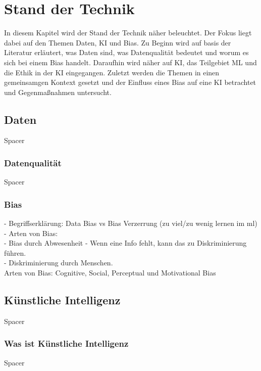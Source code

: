 \chapter{Stand der Technik}
    \begin{onehalfspace}  
        \label{sec:theorie/standdertechnik}
            In diesem Kapitel wird der Stand der Technik näher beleuchtet. Der Fokus liegt dabei auf den Themen Daten, \ac*{KI} und Bias. Zu Beginn wird auf basis der Literatur erläutert, was Daten sind, was Datenqualität bedeutet und worum es sich bei einem Bias handelt. Daraufhin wird näher auf \ac*{KI}, das Teilgebiet \ac*{ML} und die Ethik in der \ac*{KI} eingegangen. Zuletzt werden die Themen in einen gemeinsamgen Kontext gesetzt und der Einfluss eines Bias auf eine \ac*{KI} betrachtet und Gegenmaßnahmen untersucht. 
        
        \section{Daten}
        \label{subsec:daten}
            Spacer

        \subsection{Datenqualität}
        \label{subsubsec:datenqualität}
            Spacer

        \subsection{Bias}
        \label{subsubsec:Bias}
            -   Begriffserklärung: Data Bias vs Bias Verzerrung (zu viel/zu wenig lernen im ml)\\
            -   Arten von Bias: \\
                -   Bias durch Abwesenheit - Wenn eine Info fehlt, kann das zu Diskriminierung führen. \\
                -   Diskriminierung durch Menschen. \\
            Arten von Bias: Cognitive, Social, Perceptual und Motivational Bias \cite{Parkavi}
 
        \section{Künstliche Intelligenz}
        \label{subsec:KIandML}
            Spacer

        \subsection{Was ist Künstliche Intelligenz}
        \label{subsec:wasistKI}
            Spacer


\end{onehalfspace}

